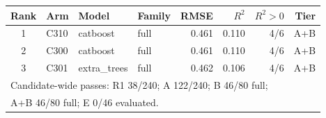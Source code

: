 \begin{tabular}{clllrrrr}
\toprule
Rank & Arm & Model & Family & RMSE & $R^2$ & $R^2{>}0$ & Tier \\
\midrule
1 & C310 & catboost & full & 0.461 & 0.110 & 4/6 & A+B \\
2 & C300 & catboost & full & 0.461 & 0.110 & 4/6 & A+B \\
3 & C301 & extra\_trees & full & 0.462 & 0.106 & 4/6 & A+B \\
\midrule\multicolumn{8}{l}{Candidate-wide passes: R1 38/240; A 122/240; B 46/80 full;} \\
\multicolumn{8}{l}{A+B 46/80 full; E 0/46 evaluated.} \\
\bottomrule
\end{tabular}
